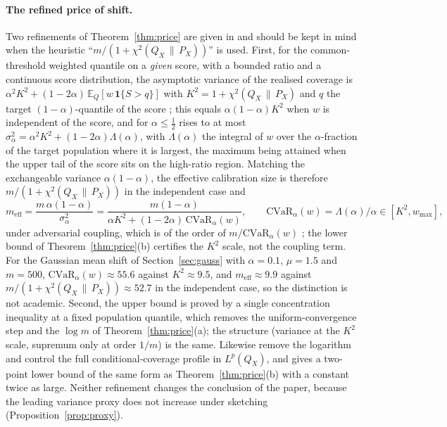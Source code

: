 \documentclass[11pt,a4paper]{article}
\newcommand{\PX}{P_X}
\newcommand{\QX}{Q_X}
\newcommand{\chisq}{\chi^2(\QX\,\|\,\PX)}
\newcommand{\E}{\mathbb{E}}
\newcommand{\ind}{\mathbf 1}
\theoremstyle{plain}
\theoremstyle{definition}
\theoremstyle{remark}
\begin{document}
\paragraph{The refined price of shift.}
Two refinements of Theorem~\ref{thm:price} are given in \cite{pournaderi2026} and should be kept in mind when the heuristic ``$m/(1+\chisq)$'' is used. First, for the common-threshold weighted quantile on a \emph{given} score, with a bounded ratio and a continuous score distribution, the asymptotic variance of the realised coverage is $\alpha^2K^2+(1-2\alpha)\,\E_Q[w\,\ind\{S>q\}]$ with $K^2=1+\chisq$ and $q$ the target $(1-\alpha)$-quantile of the score \cite[Prop.\ 10]{pournaderi2026}; this equals $\alpha(1-\alpha)K^2$ when $w$ is independent of the score, and for $\alpha\le\tfrac12$ rises to at most $\sigma_\alpha^2=\alpha^2K^2+(1-2\alpha)\Lambda(\alpha)$, with $\Lambda(\alpha)$ the integral of $w$ over the $\alpha$-fraction of the target population where it is largest, the maximum being attained when the upper tail of the score sits on the high-ratio region. Matching the exchangeable variance $\alpha(1-\alpha)$, the effective calibration size is therefore $m/(1+\chisq)$ in the independent case and
\[
m_{\mathrm{eff}}=\frac{m\,\alpha(1-\alpha)}{\sigma_\alpha^2}=\frac{m(1-\alpha)}{\alpha K^2+(1-2\alpha)\,\mathrm{CVaR}_\alpha(w)},\qquad \mathrm{CVaR}_\alpha(w)=\Lambda(\alpha)/\alpha\in[K^2,w_{\max}],
\]
under adversarial coupling, which is of the order of $m/\mathrm{CVaR}_\alpha(w)$ \cite[Rem.\ 3, Rem.\ 9]{pournaderi2026}; the lower bound of Theorem~\ref{thm:price}(b) certifies the $K^2$ scale, not the coupling term. For the Gaussian mean shift of Section~\ref{sec:gauss} with $\alpha=0.1$, $\mu=1.5$ and $m=500$, $\mathrm{CVaR}_\alpha(w)\approx55.6$ against $K^2\approx9.5$, and $m_{\mathrm{eff}}\approx9.9$ against $m/(1+\chisq)\approx52.7$ in the independent case, so the distinction is not academic. Second, the upper bound \cite[Thm.\ 1]{pournaderi2026} is proved by a single concentration inequality at a fixed population quantile, which removes the uniform-convergence step and the $\log m$ of Theorem~\ref{thm:price}(a); the structure (variance at the $K^2$ scale, supremum only at order $1/m$) is the same. Likewise \cite[Thms.\ 5--6]{isaev2026} remove the logarithm and control the full conditional-coverage profile in $L^p(\QX)$, and \cite[Thm.\ 8]{pournaderi2026} gives a two-point lower bound of the same form as Theorem~\ref{thm:price}(b) with a constant twice as large. Neither refinement changes the conclusion of the paper, because the leading variance proxy does not increase under sketching (Proposition~\ref{prop:proxy}).
\end{document}
